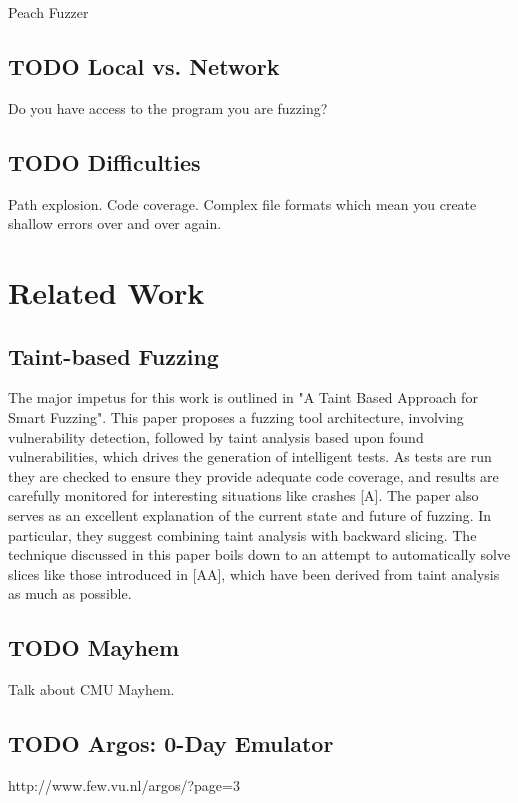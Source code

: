 \documentclass[11pt,expanded,copyright]{fsuthesis}
\begin{document}
Peach Fuzzer

\section{TODO Local vs. Network}

Do you have access to the program you are fuzzing?

\section{TODO Difficulties}

Path explosion. Code coverage. Complex file formats which mean you create shallow errors over and over again.

\chapter{Related Work}

\section{Taint-based Fuzzing}

The major impetus for this work is outlined in "A Taint Based Approach for Smart Fuzzing". This paper proposes a fuzzing tool architecture, involving vulnerability detection, followed by taint analysis based upon found vulnerabilities, which drives the generation of intelligent tests. As tests are run they are checked to ensure they provide adequate code coverage, and results are carefully monitored for interesting situations like crashes [A]. The paper also serves as an excellent explanation of the current state and future of fuzzing. In particular, they suggest combining taint analysis with backward slicing. The technique discussed in this paper boils down to an attempt to automatically solve slices like those introduced in [AA], which have been derived from taint analysis as much as possible.

\section{TODO Mayhem}

Talk about CMU Mayhem.

\section{TODO Argos: 0-Day Emulator}

http://www.few.vu.nl/argos/?page=3
\end{document}
